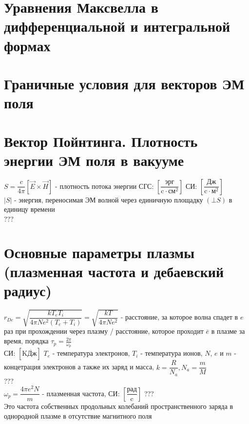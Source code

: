 \begin{multicols*}{2}
		\section{Уравнения Максвелла в дифференциальной и интегральной формах}

		\section{Граничные условия для векторов ЭМ поля}

		\section{Вектор Пойнтинга. Плотность энергии ЭМ поля в вакууме}

		$S = \dfrac{c}{4\pi} \left[\vec{E}\times \vec{H}\right]$ - плотность потока энергии \quad СГС: $\left[\dfrac{\text{эрг}}{\text{c}\cdot \text{см}^2}\right]$ \quad СИ: $\left[\dfrac{\text{Дж}}{\text{c}\cdot \text{м}^2}\right]$\\
		$\left\lvert S\right\rvert$ - энергия, переносимая ЭМ волной через единичную площадку $(\bot S)$ в единицу времени\\
		???

		\section{Основные параметры плазмы (плазменная частота и дебаевский радиус)}
		$r_{De} = \sqrt{\dfrac{k T_e T_i}{4\pi N e^2(T_e + T_i)}} = \sqrt{\dfrac{k T}{4\pi N e^2}}$ - расстояние, за которое волна спадет в $e$ раз при прохождении через плазму / расстояние, которое проходит $\bar{e}$ в плазме за время, порядка $\tau_p = \frac{2\pi}{\omega_p}$\\
		СИ: $\left[{\text{K}}\dot{\text{Дж}}\right]$
		$T_e$ - температура электронов, $T_i$ - температура ионов, $N$, $e$ и $m$ - концетрация электронов а также их заряд и масса, $k = \dfrac{R}{N_a}, N_a = \dfrac{m}{M}$\\
		???\\
		$\omega_p = \dfrac{4\pi e^2 N}{m}$ - плазменная частота, СИ: $\left[\dfrac{\text{рад}}{\text{c}}\right]$ ???\\
		Это частота собственных продольных колебаний пространственного заряда в однородной плазме в отсутствие магнитного поля


\end{multicols*}
